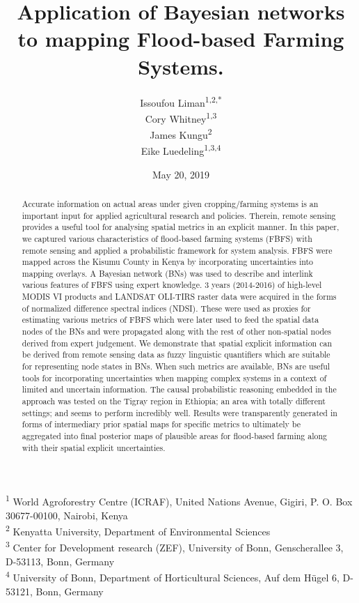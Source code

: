 \documentclass[12pt,oneside]{article}
\title{Application of Bayesian networks to mapping Flood-based Farming Systems.}
\author{Issoufou Liman\textsuperscript{1,2,*} \\ Cory Whitney\textsuperscript{1,3} \\ James Kungu\textsuperscript{2} \\ Eike Luedeling\textsuperscript{1,3,4}}
\date{May 20, 2019}
\begin{document}
\maketitle
\begin{abstract}
Accurate information on actual areas under given cropping/farming systems is an important input for applied agricultural research and policies. Therein, remote sensing provides a useful tool for analysing spatial metrics in an explicit manner. In this paper, we captured various characteristics of flood-based farming systems (FBFS) with remote sensing and applied a probabilistic framework for system analysis. FBFS were mapped across the Kisumu County in Kenya by incorporating uncertainties into mapping overlays. A Bayesian network (BNs) was used to describe and interlink various features of FBFS using expert knowledge. 3 years (2014-2016) of high-level MODIS VI products and LANDSAT OLI-TIRS raster data were acquired in the forms of normalized difference spectral indices (NDSI). These were used as proxies for estimating various metrics of FBFS which were later used to feed the spatial data nodes of the BNs and were propagated along with the rest of other non-spatial nodes derived from expert judgement. We demonstrate that spatial explicit information can be derived from remote sensing data as fuzzy linguistic quantifiers which are suitable for representing node states in BNs. When such metrics are available, BNs are useful tools for incorporating uncertainties when mapping complex systems in a context of limited and uncertain information. The causal probabilistic reasoning embedded in the approach was tested on the Tigray region in Ethiopia; an area with totally different settings; and seems to perform incredibly well. Results were transparently generated in forms of intermediary prior spatial maps for specific metrics to ultimately be aggregated into final posterior maps of plausible areas for flood-based farming along with their spatial explicit uncertainties.
\end{abstract}

{
\hypersetup{linkcolor=black}
\setcounter{tocdepth}{5}
\tableofcontents
}
\textsuperscript{1} World Agroforestry Centre (ICRAF), United Nations Avenue, Gigiri, P. O. Box 30677-00100, Nairobi, Kenya\\
\textsuperscript{2} Kenyatta University, Department of Environmental Sciences\\
\textsuperscript{3} Center for Development research (ZEF), University of Bonn, Genscherallee 3, D-53113, Bonn, Germany\\
\textsuperscript{4} University of Bonn, Department of Horticultural Sciences, Auf dem Hügel 6, D-53121, Bonn, Germany
\end{document}
